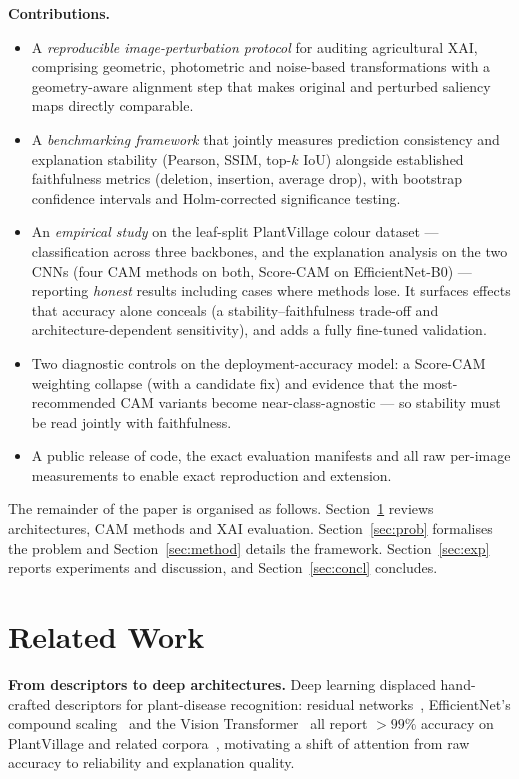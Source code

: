 \documentclass[runningheads]{llncs}
\begin{document}
\smallskip
\noindent\textbf{Contributions.}
\begin{itemize}
  \item A \emph{reproducible image-perturbation protocol} for auditing
  agricultural XAI, comprising geometric, photometric and noise-based
  transformations with a geometry-aware alignment step that makes original and
  perturbed saliency maps directly comparable.
  \item A \emph{benchmarking framework} that jointly measures prediction
  consistency and explanation stability (Pearson, SSIM, top-$k$ IoU) alongside
  established faithfulness metrics (deletion, insertion, average drop), with
  bootstrap confidence intervals and Holm-corrected significance testing.
  \item An \emph{empirical study} on the leaf-split PlantVillage colour dataset ---
  classification across three backbones, and the explanation analysis on the two
  CNNs (four CAM methods on both, Score-CAM on EfficientNet-B0) --- reporting
  \emph{honest} results including cases where methods lose. It surfaces effects that
  accuracy alone conceals (a stability--faithfulness trade-off and
  architecture-dependent sensitivity), and adds a fully fine-tuned validation.
  \item Two diagnostic controls on the deployment-accuracy model: a Score-CAM
  weighting collapse (with a candidate fix) and evidence that the most-recommended
  CAM variants become near-class-agnostic --- so stability must be read jointly with
  faithfulness.
  \item A public release of code, the exact evaluation manifests and all raw
  per-image measurements to enable exact reproduction and extension.
\end{itemize}

\noindent The remainder of the paper is organised as follows. Section~\ref{sec:rw}
reviews architectures, CAM methods and XAI evaluation. Section~\ref{sec:prob}
formalises the problem and Section~\ref{sec:method} details the framework.
Section~\ref{sec:exp} reports experiments and discussion, and
Section~\ref{sec:concl} concludes.

\section{Related Work}\label{sec:rw}
\noindent\textbf{From descriptors to deep architectures.}
Deep learning displaced hand-crafted descriptors for plant-disease recognition:
residual networks~\cite{he2016resnet}, EfficientNet's compound
scaling~\cite{tan2019efficientnet} and the Vision
Transformer~\cite{dosovitskiy2021vit} all report $>99\%$ accuracy on
PlantVillage and related corpora~\cite{mohanty2016plantvillage,ferentinos2018,too2019},
motivating a shift of attention from raw accuracy to reliability and explanation
quality.
\end{document}
